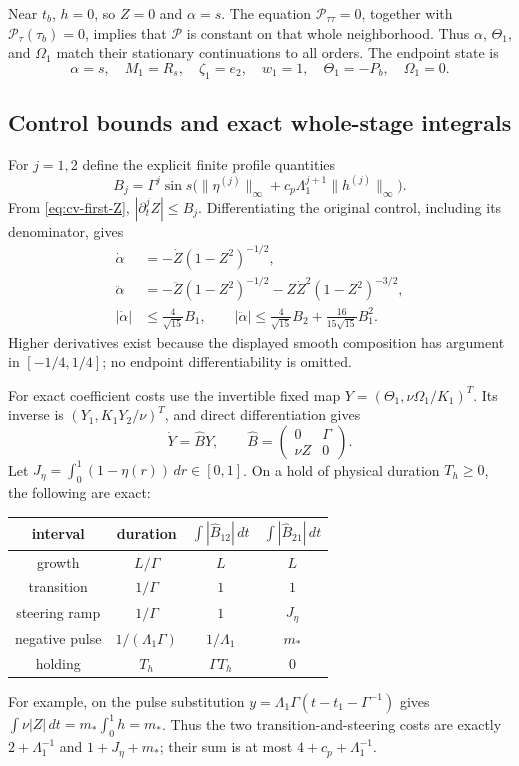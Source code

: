 Near $t_b$, $h=0$, so $Z=0$ and $\alpha=s$.
The equation $\mathcal P_{\tau\tau}=0$, together with
$\mathcal P_\tau(\tau_b)=0$, implies that $\mathcal P$ is constant
on that whole neighborhood. Thus $\alpha$, $\Theta_1$, and $\Omega_1$
match their stationary continuations to all orders. The endpoint state is
\begin{equation}
 \alpha=s,\quad M_1=R_s,\quad\zeta_1=e_2,\quad
 w_1=1,\quad\Theta_1=-P_b,\quad\Omega_1=0.
 \label{eq:cv-first-endpoint}
\end{equation}

\subsection{Control bounds and exact whole-stage integrals}

For $j=1,2$ define the explicit finite profile quantities
\[
 B_j=\Gamma^j\sin s\bigl(\|\eta^{(j)}\|_\infty
            +c_p\Lambda_1^{j+1}\|h^{(j)}\|_\infty\bigr).
\]
From \eqref{eq:cv-first-Z}, $|\partial_t^jZ|\leq B_j$.
Differentiating the original control, including its denominator, gives
\begin{align}
 \dot\alpha&=-\dot Z(1-Z^2)^{-1/2},\\
 \ddot\alpha&=-\ddot Z(1-Z^2)^{-1/2}
              -Z\dot Z^2(1-Z^2)^{-3/2},\nonumber\\
 |\dot\alpha|&\leq\frac4{\sqrt{15}}B_1,\qquad
 |\ddot\alpha|\leq\frac4{\sqrt{15}}B_2
                    +\frac{16}{15\sqrt{15}}B_1^2.
 \label{eq:cv-first-control-bounds}
\end{align}
Higher derivatives exist because the displayed smooth composition has
argument in $[-1/4,1/4]$; no endpoint differentiability is omitted.

For exact coefficient costs use the invertible fixed map
$Y=(\Theta_1,\nu\Omega_1/K_1)^T$. Its inverse is
$(Y_1,K_1Y_2/\nu)^T$, and direct differentiation gives
\[
 \dot Y=\widehat B Y,\qquad
 \widehat B=\begin{pmatrix}0&\Gamma\\\nu Z&0\end{pmatrix}.
\]
Let $J_\eta=\int_0^1(1-\eta(r))\,dr\in[0,1]$.
On a hold of physical duration $T_h\geq0$, the following are exact:
\begin{center}
\begin{tabular}{c|c|c|c}
interval&duration&$\int|\widehat B_{12}|\,dt$
                      &$\int|\widehat B_{21}|\,dt$\\\hline
growth&$L/\Gamma$&$L$&$L$\\
transition&$1/\Gamma$&$1$&$1$\\
steering ramp&$1/\Gamma$&$1$&$J_\eta$\\
negative pulse&$1/(\Lambda_1\Gamma)$&$1/\Lambda_1$&$m_*$\\
holding&$T_h$&$\Gamma T_h$&$0$
\end{tabular}
\end{center}
For example, on the pulse substitution
$y=\Lambda_1\Gamma(t-t_1-\Gamma^{-1})$ gives
$\int\nu|Z|\,dt=m_*\int_0^1h=m_*$.
Thus the two transition-and-steering costs are exactly
$2+\Lambda_1^{-1}$ and $1+J_\eta+m_*$;
their sum is at most $4+c_p+\Lambda_1^{-1}$.

